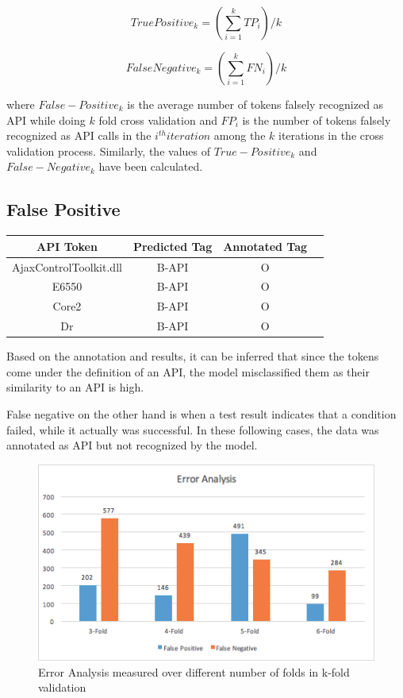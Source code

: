 \documentclass{sig-alternate-05-2015}
\begin{document}
\begin{equation}
True Positive_k = (\sum_{i = 1}^{k} TP_i)/k
\end{equation}

\begin{equation}
False Negative_k = (\sum_{i = 1}^{k} FN_i)/k
\end{equation}

where $False-Positive_k$ is the average number of tokens falsely recognized as API while doing $k$ fold cross validation and $FP_i$ is the number of tokens falsely recognized as API calls in the $i^{th} iteration$ among the $k$ iterations in the cross validation process. Similarly, the values of $True-Positive_k$ and $False-Negative_k$ have been calculated.

\subsection{False Positive}

\begin{center}
\begin{tabular}{ |c|c|c|c| } 
\hline
API Token & Predicted Tag & Annotated Tag \\
\hline
{AjaxControlToolkit.dll} & B-API & O \\ 
E6550 & B-API & O \\ 
Core2 & B-API & O \\ 
Dr & B-API & O \\
\hline
\end{tabular}
\end{center}

Based on the annotation and results, it can be inferred that since the tokens come under the definition of an API, the model misclassified them as their similarity to an API is high.

False negative on the other hand is when a test result indicates that a condition failed, while it actually was successful. In these following cases, the data was annotated as API but not recognized by the model. 
\begin{figure}
\centering
  \includegraphics[width=\linewidth]{Performance2.png}
  \caption{Error Analysis measured over different number of folds in k-fold validation}
  \label{fig:Performance2}
\end{figure}
\end{document}
